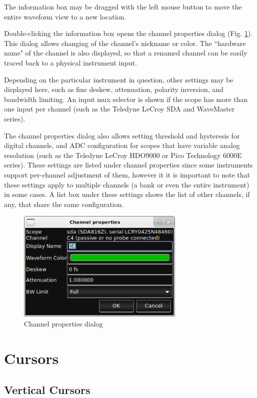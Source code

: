 The information box may be dragged with the left mouse button to move the entire waveform view to a new location.

Double-clicking the information box opens the channel properties dialog (Fig. \ref{channel-properties}). This dialog
allows changing of the channel's nickname or color. The ``hardware name" of the channel is also displayed, so that a
renamed channel can be easily traced back to a physical instrument input.

Depending on the particular instrument in question, other settings may be displayed here, such as fine deskew,
attenuation, polarity inversion, and bandwidth limiting. An input mux selector is shown if the scope has more than one
input per channel (such as the Teledyne LeCroy SDA and WaveMaster series).

The channel properties dialog also allows setting threshold and hysteresis for digital channels, and ADC configuration
for scopes that have variable analog resolution (such as the Teledyne LeCroy HDO9000 or Pico Technology 6000E series).
These settings are listed under channel properties since some instruments support per-channel adjustment of them,
however it it is important to note that these settings apply to multiple channels (a bank or even the entire
instrument) in some cases. A list box under these settings shows the list of other channels, if any, that share the
same configuration.

\begin{figure}[H]
\centering
\includegraphics[width=8cm]{images/channel-properties.png}
\caption{Channel properties dialog}
\label{channel-properties}
\end{figure}

\section{Cursors}

\subsection{Vertical Cursors}

